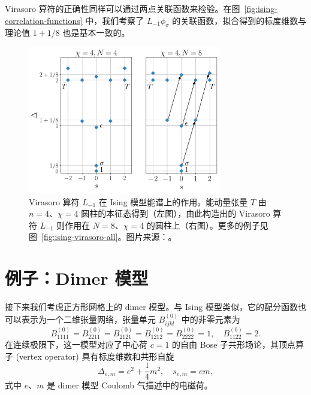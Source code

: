 Virasoro 算符的正确性同样可以通过两点关联函数来检验。在图~\ref{fig:ising-correlation-functions} 中，我们考察了 $L_{-1}\phi_\sigma$ 的关联函数，拟合得到的标度维数与理论值 $1+1/8$ 也是基本一致的。

\begin{figure}[ht]
  \centering
  \includegraphics[width=0.75\textwidth]{images/virasoro/ising-spectrum.pdf}
  \caption[Virasoro 算符在 Ising 模型能谱上的作用]{Virasoro 算符 $L_{-1}$ 在 Ising 模型能谱上的作用。能动量张量 $T$ 由 $n=4$、$\chi=4$ 圆柱的本征态得到（左图），由此构造出的 Virasoro 算符 $L_{-1}$ 则作用在 $N=8$、$\chi=4$ 的圆柱上（右图）。更多的例子见图~\ref{fig:ising-virasoro-all}。图片来源：\parencite{wang2022virasoro}。}
  \label{fig:ising-virasoro}
\end{figure}

\section{例子：Dimer 模型}

接下来我们考虑正方形网格上的 dimer 模型\cite{kasteleyn1961statistics,temperley1961dimer,kasteleyn1963dimer}。与 Ising 模型类似，它的配分函数也可以表示为一个二维张量网络，张量单元 $B^{(0)}_{ijkl}$ 中的非零元素为
\begin{equation}
  B^{(0)}_{1111} = B^{(0)}_{2211} = B^{(0)}_{2121} = B^{(0)}_{1212} = B^{(0)}_{2222} = 1, \quad
  B^{(0)}_{1122} = 2.
\end{equation}
在连续极限下，这一模型对应了中心荷 $c=1$ 的自由 Bose 子共形场论\cite{ioffe1989superconductivity,henley1997relaxation,allegra2015exact}，其顶点算子 (vertex operator) 具有标度维数和共形自旋
\begin{equation}
  \Delta_{e,m} = e^2 + \frac14 m^2, \quad
  s_{e,m} = em,
\end{equation}
式中 $e$、$m$ 是 dimer 模型 Coulomb 气描述中的电磁荷。


